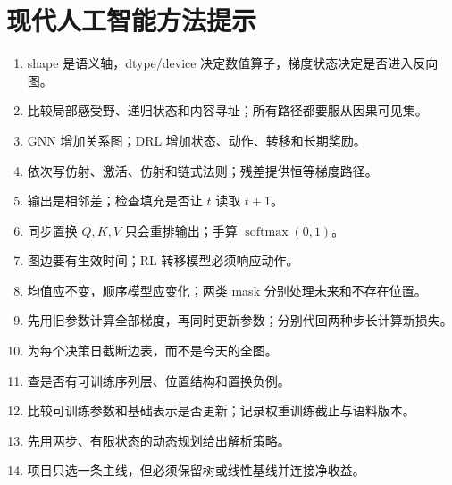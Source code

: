 \chapter{现代人工智能方法提示}
\begin{enumerate}[leftmargin=*]
  \item shape 是语义轴，dtype/device 决定数值算子，梯度状态决定是否进入反向图。
  \item 比较局部感受野、递归状态和内容寻址；所有路径都要服从因果可见集。
  \item GNN 增加关系图；DRL 增加状态、动作、转移和长期奖励。
  \item 依次写仿射、激活、仿射和链式法则；残差提供恒等梯度路径。
  \item 输出是相邻差；检查填充是否让 $t$ 读取 $t+1$。
  \item 同步置换 $Q,K,V$ 只会重排输出；手算 $\operatorname{softmax}(0,1)$。
  \item 图边要有生效时间；RL 转移模型必须响应动作。
  \item 均值应不变，顺序模型应变化；两类 mask 分别处理未来和不存在位置。
  \item 先用旧参数计算全部梯度，再同时更新参数；分别代回两种步长计算新损失。
  \item 为每个决策日截断边表，而不是今天的全图。
  \item 查是否有可训练序列层、位置结构和置换负例。
  \item 比较可训练参数和基础表示是否更新；记录权重训练截止与语料版本。
  \item 先用两步、有限状态的动态规划给出解析策略。
  \item 项目只选一条主线，但必须保留树或线性基线并连接净收益。
\end{enumerate}
